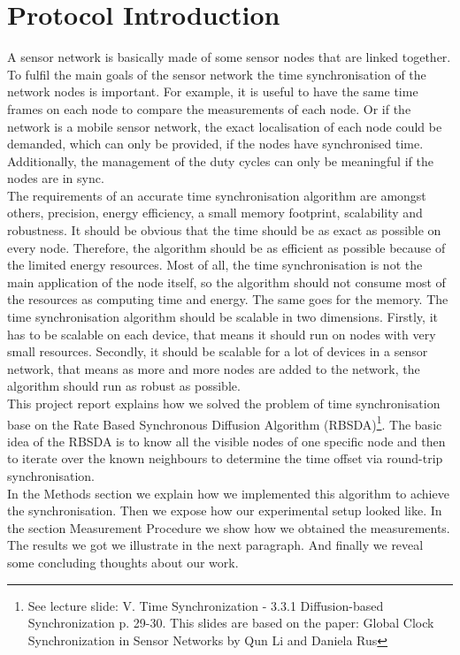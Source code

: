 \documentclass{llncs}
\begin{document}
\section{Protocol Introduction}
A sensor network is basically made of some sensor nodes that are linked together. To fulfil the main goals of the sensor network the time synchronisation of the network nodes is important.  For example, it is useful to have the same time frames on each node to compare the measurements of each node. Or if the network is a mobile sensor network, the exact localisation of each node could be demanded, which can only be provided, if the nodes have synchronised time. Additionally, the management of the duty cycles can only be meaningful if the nodes are in sync.\\
The requirements of an accurate time synchronisation algorithm are amongst others, precision, energy efficiency, a small memory footprint, scalability and robustness. It should be obvious that the time should be as exact as possible on every node. Therefore, the algorithm should be as efficient as possible because of the limited energy resources. Most of all, the time synchronisation is not the main application of the node itself, so the algorithm should not consume most of the resources as computing time and energy. The same goes for the memory.
\noindent The time synchronisation algorithm should be scalable in two dimensions. Firstly, it has to be scalable on each device, that means it should run on nodes with very small resources. Secondly, it should be scalable for a lot of devices in a sensor network, that means as more and more nodes are added to the network, the algorithm should run as robust as possible.\\
\noindent This project report explains how we solved the problem of time synchronisation base on the Rate Based Synchronous Diffusion Algorithm (RBSDA)\footnote{See lecture slide: V. Time Synchronization - 3.3.1 Diffusion-based Synchronization p. 29-30. This slides are based on the paper: Global Clock Synchronization
in Sensor Networks by Qun Li and  Daniela Rus\cite{LiRus2006}}. The basic idea of the RBSDA is to know all the visible nodes of one specific node and then to iterate over the known neighbours to determine the time offset via round-trip synchronisation.\\
In the Methods section we explain how we implemented this algorithm to achieve the synchronisation. Then we expose how our experimental setup looked like. In the section Measurement Procedure we show how we obtained the measurements. The results we got we  illustrate in the next paragraph. And finally we reveal some concluding thoughts about our work. 
\end{document}
